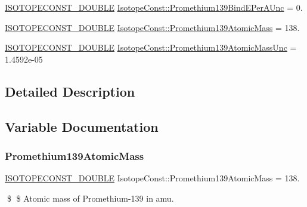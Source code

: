 \begin{DoxyCompactItemize}
\item 
\mbox{\hyperlink{group___isotope_const-_macros_ga8f45a7272ce02c0b4c65c44636ed719a}{I\+S\+O\+T\+O\+P\+E\+C\+O\+N\+S\+T\+\_\+\+D\+O\+U\+B\+LE}} \mbox{\hyperlink{group___isotope_const-_promethium-_pm139_gac2b703f69d2c5392a53198a84c87b35a}{Isotope\+Const\+::\+Promethium139\+Bind\+E\+Per\+A\+Unc}} = 0.
\item 
\mbox{\hyperlink{group___isotope_const-_macros_ga8f45a7272ce02c0b4c65c44636ed719a}{I\+S\+O\+T\+O\+P\+E\+C\+O\+N\+S\+T\+\_\+\+D\+O\+U\+B\+LE}} \mbox{\hyperlink{group___isotope_const-_promethium-_pm139_ga6bfc3a21901c73337dd56b3acb120cf2}{Isotope\+Const\+::\+Promethium139\+Atomic\+Mass}} = 138.
\item 
\mbox{\hyperlink{group___isotope_const-_macros_ga8f45a7272ce02c0b4c65c44636ed719a}{I\+S\+O\+T\+O\+P\+E\+C\+O\+N\+S\+T\+\_\+\+D\+O\+U\+B\+LE}} \mbox{\hyperlink{group___isotope_const-_promethium-_pm139_ga467f169a49c458b81722d55d16b65908}{Isotope\+Const\+::\+Promethium139\+Atomic\+Mass\+Unc}} = 1.\+4592e-\/05
\end{DoxyCompactItemize}


\subsection{Detailed Description}


\subsection{Variable Documentation}
\mbox{\label{group___isotope_const-_promethium-_pm139_ga6bfc3a21901c73337dd56b3acb120cf2}} 
\subsubsection{\texorpdfstring{Promethium139\+Atomic\+Mass}{Promethium139AtomicMass}}
{\footnotesize\ttfamily \mbox{\hyperlink{group___isotope_const-_macros_ga8f45a7272ce02c0b4c65c44636ed719a}{I\+S\+O\+T\+O\+P\+E\+C\+O\+N\+S\+T\+\_\+\+D\+O\+U\+B\+LE}} Isotope\+Const\+::\+Promethium139\+Atomic\+Mass = 138.}

\$ \$ Atomic mass of Promethium-\/139 in amu. \mbox{\label{group___isotope_const-_promethium-_pm139_ga467f169a49c458b81722d55d16b65908}} 
